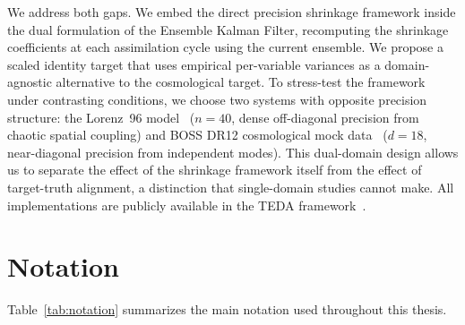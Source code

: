 We address both gaps. We embed the \citep{bodnar2016direct} direct precision shrinkage framework inside the dual formulation of the Ensemble Kalman Filter, recomputing the shrinkage coefficients at each assimilation cycle using the current ensemble. We propose a scaled identity target that uses empirical per-variable variances as a domain-agnostic alternative to the cosmological target. To stress-test the framework under contrasting conditions, we choose two systems with opposite precision structure: the Lorenz~96 model~\citep{lorenz1996predictability} ($n = 40$, dense off-diagonal precision from chaotic spatial coupling) and BOSS DR12 cosmological mock data~\citep{looijmans2024comparison} ($d = 18$, near-diagonal precision from independent modes). This dual-domain design allows us to separate the effect of the shrinkage framework itself from the effect of target-truth alignment, a distinction that single-domain studies cannot make. All implementations are publicly available in the TEDA framework~\citep{nino2022teda}.

\section{Notation}
\label{sec:notation}

Table~\ref{tab:notation} summarizes the main notation used throughout this thesis.

